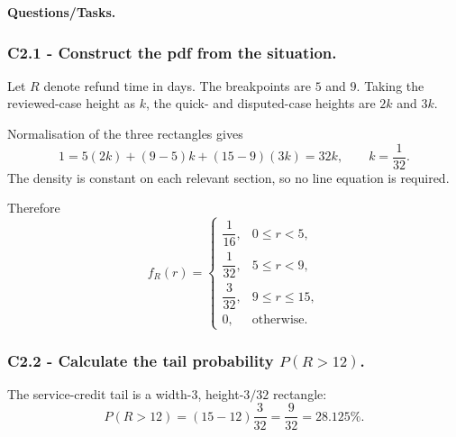 \begingroup{}
\endgroup

\textbf{Questions/Tasks.}
\begin{enumerate}
\end{enumerate}

\subsubsection*{C2.1 - Construct the pdf from the situation.}
\label{subsec:c2-piecewise-uniform-refund-a}
Let $R$ denote refund time in days.  The breakpoints are $5$ and $9$.  Taking
the reviewed-case height as $k$, the quick- and disputed-case heights are $2k$
and $3k$.

Normalisation of the three rectangles gives
\[
 1=5(2k)+(9-5)k+(15-9)(3k)=32k,\qquad k=\frac1{32}.
\]
The density is constant on each relevant section, so no line equation is required.

Therefore
\[
 f_R(r)=\begin{cases}
 \dfrac1{16},&0\le r<5,\\[1mm]
 \dfrac1{32},&5\le r<9,\\[1mm]
 \dfrac3{32},&9\le r\le15,\\[1mm]
 0,&\text{otherwise.}
 \end{cases}
\]

\subsubsection*{C2.2 - Calculate the tail probability $P(R>12)$.}
\label{subsec:c2-piecewise-uniform-refund-b}
The service-credit tail is a width-$3$, height-$3/32$ rectangle:
\[
 P(R>12)=(15-12)\frac3{32}=\frac9{32}=28.125\%.
\]

